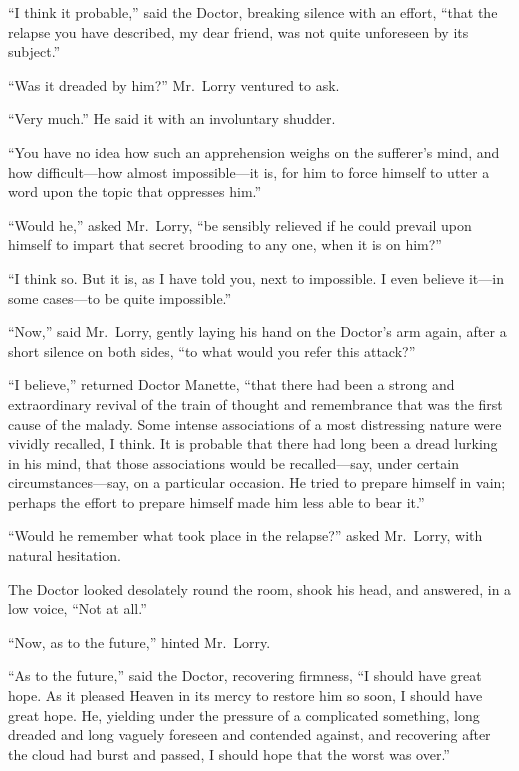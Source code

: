 ``I think it probable,'' said the Doctor, breaking silence with an
effort, ``that the relapse you have described, my dear friend, was
not quite unforeseen by its subject.''

``Was it dreaded by him?'' Mr.\ Lorry ventured to ask.

``Very much.''  He said it with an involuntary shudder.

``You have no idea how such an apprehension weighs on the sufferer's
mind, and how difficult---how almost impossible---it is, for him to force
himself to utter a word upon the topic that oppresses him.''

``Would he,'' asked Mr.\ Lorry, ``be sensibly relieved if he could
prevail upon himself to impart that secret brooding to any one,
when it is on him?''

``I think so.  But it is, as I have told you, next to impossible.
I even believe it---in some cases---to be quite impossible.''

``Now,'' said Mr.\ Lorry, gently laying his hand on the Doctor's arm
again, after a short silence on both sides, ``to what would you refer
this attack?''

``I believe,'' returned Doctor Manette, ``that there had been a strong
and extraordinary revival of the train of thought and remembrance that
was the first cause of the malady.  Some intense associations of a
most distressing nature were vividly recalled, I think.  It is probable
that there had long been a dread lurking in his mind, that those
associations would be recalled---say, under certain circumstances---say,
on a particular occasion.  He tried to prepare himself in vain; perhaps
the effort to prepare himself made him less able to bear it.''

``Would he remember what took place in the relapse?'' asked Mr.\ Lorry,
with natural hesitation.

The Doctor looked desolately round the room, shook his head, and
answered, in a low voice, ``Not at all.''

``Now, as to the future,'' hinted Mr.\ Lorry.

``As to the future,'' said the Doctor, recovering firmness, ``I should
have great hope.  As it pleased Heaven in its mercy to restore him so
soon, I should have great hope.  He, yielding under the pressure of a
complicated something, long dreaded and long vaguely foreseen and
contended against, and recovering after the cloud had burst and passed,
I should hope that the worst was over.''

